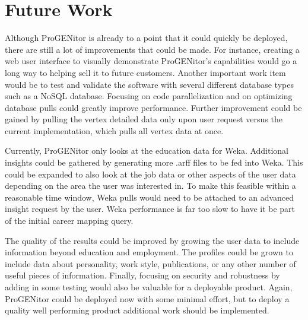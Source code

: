 \section{Future Work}
\label{sect:future-work}
Although ProGENitor is already to a point that it could quickly be deployed,
there are still a lot of improvements that could be made.  For
instance, creating a web user interface to visually demonstrate ProGENitor's
capabilities would go a long way to helping sell it to future customers. 
Another important work item would be to test and validate the software with
several different database types such as a NoSQL database.  Focusing on code
parallelization and on optimizing database pulls could greatly improve
performance.  Further improvement could be gained by pulling the vertex detailed
data only upon user request versus the current implementation, which pulls all
vertex data at once.

Currently, ProGENitor only looks at the education data for Weka.  Additional
insights could be gathered by generating more .arff files to be fed into
Weka.  This could be expanded to also look at the job data or other aspects of
the user data depending on the area the user was interested in.  To make this
feasible within a reasonable time window, Weka pulls would need to be attached
to an advanced insight request by the user.  Weka performance is far too slow to
have it be part of the initial career mapping query.

The quality of the results could be improved by growing the user data to include
information beyond education and employment.  The profiles could be grown to
include data about personality, work style, publications, or any other number of
useful pieces of information.  Finally, focusing on security and robustness by
adding in some testing would also be valuable for a deployable product.  Again,
ProGENitor could be deployed now with some minimal effort, but to deploy a
quality well performing product additional work should be implemented.
